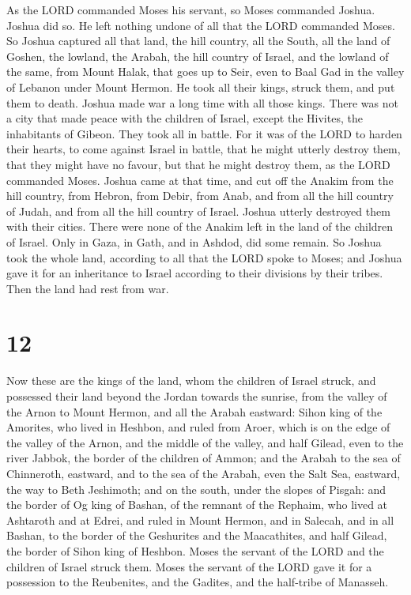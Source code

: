  As the LORD commanded Moses his servant, so Moses
commanded Joshua. Joshua did so. He left nothing undone of all that the
LORD commanded Moses.  So Joshua captured all that land,
the hill country, all the South, all the land of Goshen, the lowland,
the Arabah, the hill country of Israel, and the lowland of the same,
 from Mount Halak, that goes up to Seir, even to Baal Gad
in the valley of Lebanon under Mount Hermon. He took all their kings,
struck them, and put them to death.  Joshua made war a
long time with all those kings.  There was not a city
that made peace with the children of Israel, except the Hivites, the
inhabitants of Gibeon. They took all in battle.  For it
was of the LORD to harden their hearts, to come against Israel in
battle, that he might utterly destroy them, that they might have no
favour, but that he might destroy them, as the LORD commanded Moses.
 Joshua came at that time, and cut off the Anakim from
the hill country, from Hebron, from Debir, from Anab, and from all the
hill country of Judah, and from all the hill country of Israel. Joshua
utterly destroyed them with their cities.  There were
none of the Anakim left in the land of the children of Israel. Only in
Gaza, in Gath, and in Ashdod, did some remain.  So Joshua
took the whole land, according to all that the LORD spoke to Moses; and
Joshua gave it for an inheritance to Israel according to their divisions
by their tribes. Then the land had rest from war.

\hypertarget{section-11}{%
\section{12}\label{section-11}}

 Now these are the kings of the land, whom the children of
Israel struck, and possessed their land beyond the Jordan towards the
sunrise, from the valley of the Arnon to Mount Hermon, and all the
Arabah eastward:  Sihon king of the Amorites, who lived in
Heshbon, and ruled from Aroer, which is on the edge of the valley of the
Arnon, and the middle of the valley, and half Gilead, even to the river
Jabbok, the border of the children of Ammon;  and the
Arabah to the sea of Chinneroth, eastward, and to the sea of the Arabah,
even the Salt Sea, eastward, the way to Beth Jeshimoth; and on the
south, under the slopes of Pisgah:  and the border of Og
king of Bashan, of the remnant of the Rephaim, who lived at Ashtaroth
and at Edrei,  and ruled in Mount Hermon, and in Salecah,
and in all Bashan, to the border of the Geshurites and the Maacathites,
and half Gilead, the border of Sihon king of Heshbon. 
Moses the servant of the LORD and the children of Israel struck them.
Moses the servant of the LORD gave it for a possession to the
Reubenites, and the Gadites, and the half-tribe of Manasseh.

